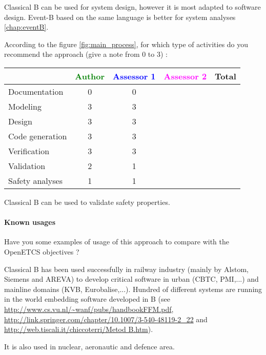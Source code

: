 \begin{author_comment}
Classical B can be used for system design, however it is most adapted to software design. Event-B  based on the same language is better for system analyses \ref{chap:eventB}.
\end{author_comment}

According to the figure \ref{fig:main_process}, for which type of activities do you recommend the approach (give a note from 0 to  3) :

\begin{tabular}{|l | c | c | c | c|}
\hline
& \textcolor{green}{Author} & \textcolor{blue}{Assessor 1} & \textcolor{magenta}{Assessor 2} & Total \\
\hline 
Documentation & 0 & 0 & &  \\
\hline
Modeling & 3 & 3 & &  \\
\hline
Design & 3 & 3 & & \\
\hline
Code generation & 3 & 3 & & \\
\hline
Verification & 3 & 3 & & \\
\hline
Validation & 2 & 1 & & \\
\hline
Safety analyses & 1 & 1 & & \\
\hline
\end{tabular}


\begin{author_comment}
Classical B  can be used to  validate safety properties.
\end{author_comment}

\paragraph{Known usages} Have you some examples of usage of this approach to  compare with the OpenETCS objectives ?

\begin{author_comment}

Classical B has been used successfully  in railway  industry (mainly by Alstom, Siemens and AREVA) to  develop critical software in urban (CBTC, PMI,...) and mainline domains (KVB, Eurobalise,...). Hundred of different systems are running in the world embedding software developed in B (see \url{http://www.cs.vu.nl/~wanf/pubs/handbookFFM.pdf}, \url{http://link.springer.com/chapter/10.1007/3-540-48119-2_22} and \url{http://web.tiscali.it/chiccoterri/Metod B.htm}).

It is also used in nuclear, aeronautic and defence area.

\end{author_comment}


